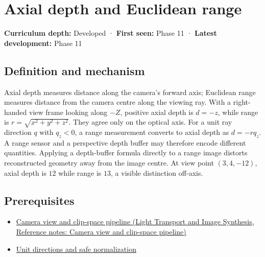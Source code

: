 \hypertarget{appendix-cac01ebeeb11}{}\label{referencestart:appendix-cac01ebeeb11}
\section{Axial depth and Euclidean range}\label{appendix-cac01ebeeb11-axial-depth-and-euclidean-range}

\textbf{Curriculum depth:} Developed · \textbf{First seen:} Phase 11 · \textbf{Latest development:} Phase 11

\begin{allmightroledefinition}

\subsection{Definition and mechanism}\label{appendix-cac01ebeeb11-definition-and-mechanism}

Axial depth measures distance along the camera's forward axis; Euclidean range measures distance from the camera centre along the viewing ray. With a right-handed view frame looking along \(-Z\), positive axial depth is \(d=-z\), while range is \(r=\sqrt{x^2+y^2+z^2}\). They agree only on the optical axis. For a unit ray direction \(q\) with \(q_z<0\), a range measurement converts to axial depth as \(d=-rq_z\). A range sensor and a perspective depth buffer may therefore encode different quantities. Applying a depth-buffer formula directly to a range image distorts reconstructed geometry away from the image centre. At view point \((3,4,-12)\), axial depth is \(12\) while range is \(13\), a visible distinction off-axis.

\end{allmightroledefinition}

\subsection{Prerequisites}\label{appendix-cac01ebeeb11-prerequisites}

\begin{itemize}
\tightlist
\item
  \href{../04-Light-Transport-and-Image-Synthesis/main.pdf\#nameddest=appendix-1c07d64f5e70}{Camera view and clip-space pipeline (Light Transport and Image Synthesis, Reference notes: Camera view and clip-space pipeline)}
\item
  \hyperref[appendix-f744e41b95b4]{Unit directions and safe normalization}
\end{itemize}

